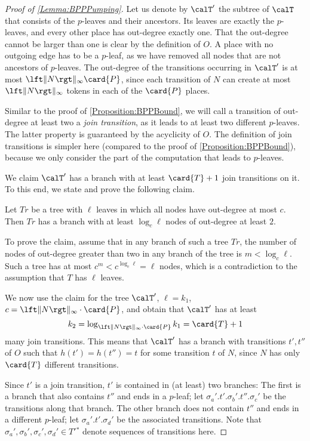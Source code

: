 \documentclass[../../diss.tex]{subfiles}
\begin{document}
\begin{proof}[Proof of \cref{Lemma:BPPPumping}]
    Let us denote by $\calT'$ the subtree of $\calT$ that consists of the $p$-leaves and their ancestors.
    Its leaves are exactly the $p$-leaves, and every other place has out-degree exactly one.
    That the out-degree cannot be larger than one is clear by the definition of $O$.
    A place with no outgoing edge has to be a $p$-leaf, as we have removed all nodes that are not ancestors of $p$-leaves.
    The out-degree of the transitions occurring in $\calT'$ is at most $\norminf{N} \card{P}$, since each transition of $N$ can create at most $\norminf{N}$ tokens in each of the $\card{P}$ places.

    Similar to the proof of \cref{Proposition:BPPBound}, we will call a transition of out-degree at least two a \emph{join transition}, as it leads to at least two different $p$-leaves.
    The latter property is guaranteed by the acyclicity of $O$.
    The definition of join transitions is simpler here (compared to the proof of \cref{Proposition:BPPBound}), because we only consider the part of the computation that leads to $p$-leaves.

    We claim $\calT'$ has a branch with at least $\card{T} + 1$ join transitions on it.
    To this end, we state and prove the following claim.


    Let $\mathit{Tr}$ be a tree with $\ell$ leaves in which all nodes have out-degree at most $c$.
    Then $\mathit{Tr}$ has a branch with at least $\log_c \ell$ nodes of out-degree at least $2$.

    To prove the claim, assume that in any branch of such a tree $\mathit{Tr}$, the number of nodes of out-degree greater than two in any branch of the tree is $m < \log_c \ell$.
    Such a tree has at most $c^m < c^{\log_c \ell} = \ell$ nodes, which is a contradiction to the assumption that $T$ has $\ell$ leaves.

    We now use the claim for the tree $\calT'$, $\ell = k_1$, $c = \norminf{N} \cdot \card{P}$, and obtain that $\calT'$ has at least
    \[
        k_2 = \log_{\norminf{N} \cdot \card{P} } k_1 = \card{T} + 1
    \]
    many join transitions.
    This means that $\calT'$ has a branch with transitions $t',t''$ of $O$ such that $h(t') = h(t'') = t$ for some transition $t$ of $N$, since $N$ has only $\card{T}$ different transitions.

    Since $t'$ is a join transition, $t'$ is contained in (at least) two branches:
    The first is a branch that also contains $t''$ and ends in a $p$-leaf; let $\sigma_a'.t'.\sigma_b'.t''.\sigma_c'$ be the transitions along that branch.
    The other branch does not contain $t''$ and ends in a different $p$-leaf; let $\sigma_a'.t'.\sigma_d'$ be the associated transitions.
    Note that $\sigma_a', \sigma_b', \sigma_c', \sigma_d' \in {T'}{}^*$ denote sequences of transitions here.


\end{proof}
\end{document}
